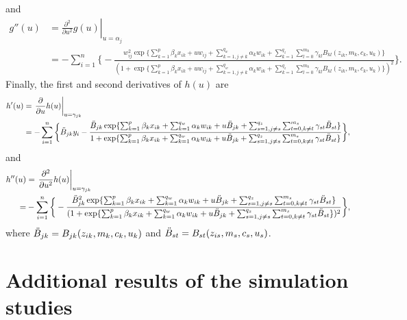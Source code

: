 \documentclass[11pt]{article}
\begin{document}
and
\begin{equation*}
\begin{split}
g''(u) & = \left. \frac{\partial^2}{\partial u^2} g(u) \right\vert_{u=\alpha_j} \\ & = - \sum^n_{i=1} \bigg\{- \frac{w^2_{ij} \exp\{ \sum^p_{k=1} \beta_k x_{ik} + u w_{ij} +\sum^{q_w}_{k=1, j \neq k} \alpha_k w_{ik} + \sum^{q_z}_{k=1} \sum^{m_k}_{l=0} \gamma_{kl} B_{kl}(z_{ik},m_k,c_k,u_k) \} }{(1+\exp\{ \sum^p_{k=1} \beta_k x_{ik} + u w_{ij} +\sum^{q_w}_{k=1, j \neq k} \alpha_k w_{ik} +  \sum^{q_z}_{k=1} \sum^{m_k}_{l=0} \gamma_{kl} B_{kl}(z_{ik},m_k,c_k,u_k) \})^2} \bigg\}.
\end{split}
\end{equation*}
Finally, the first and second derivatives of $h(u)$ are
\begin{equation*}
\begin{split}
h'(u) & = \left. \frac{\partial}{\partial u} h(u) \right\vert_{u=\gamma_{jk}} \\
& = - \sum^n_{i=1} \bigg\{ \Ddot{B}_{jk} y_i  - \frac{\Ddot{B}_{jk} \exp\{ \sum^p_{k=1} \beta_k x_{ik} + \sum^{q_w}_{k=1} \alpha_k w_{ik} + u \Ddot{B}_{jk} + \sum^{q_z}_{s=1, j \neq s} \sum^{m_s}_{t=0, k \neq t} \gamma_{st} \Ddot{B}_{st}\}}{1+\exp\{ \sum^p_{k=1} \beta_k x_{ik} + \sum^{q_w}_{k=1} \alpha_k w_{ik} + u \Ddot{B}_{jk} + \sum^{q_z}_{s=1, j \neq s} \sum^{m_s}_{t=0, k \neq t} \gamma_{st} \Ddot{B}_{st}\}}\bigg \} ,
\end{split}
\end{equation*}
and
\begin{equation*}
\begin{split}
h''(u) &= \left. \frac{\partial^2}{\partial u^2} h(u) \right\vert_{u=\gamma_{jk}} \\ = & - \sum^n_{i=1} \bigg\{ - \frac{\Ddot{B}^2_{jk} \exp\{ \sum^p_{k=1} \beta_k x_{ik} + \sum^{q_w}_{k=1} \alpha_k w_{ik} + u \Ddot{B}_{jk} + \sum^{q_z}_{s=1, j \neq s} \sum^{m_s}_{t=0, k \neq t} \gamma_{st} \Ddot{B}_{st} \}}{(1+\exp\{ \sum^p_{k=1} \beta_k x_{ik} + \sum^{q_w}_{k=1} \alpha_k w_{ik} + u \Ddot{B}_{jk} + \sum^{q_z}_{s=1, j \neq s} \sum^{m_s}_{t=0, k \neq t} \gamma_{st} \Ddot{B}_{st} \})^2}\bigg\} ,
\end{split}
\end{equation*}
where $\Ddot{B}_{jk}= B_{jk}(z_{ik},m_k,c_k,u_k)$ and $\Ddot{B}_{st} = B_{st}(z_{is}, m_s, c_s, u_s)$.

\section*{Additional results of the simulation studies}
\end{document}
